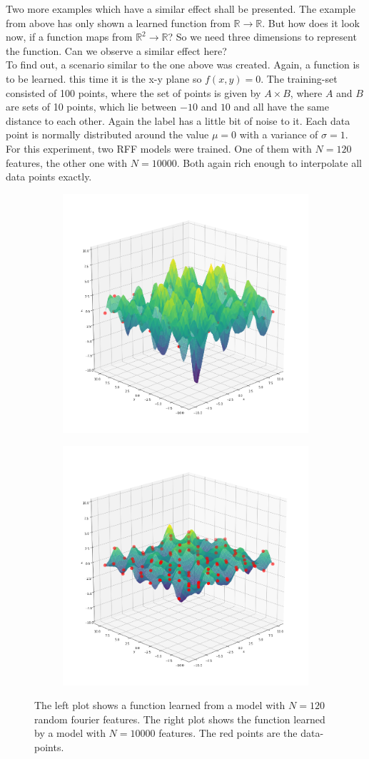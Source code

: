\newpage

Two more examples which have a similar effect shall be presented.
The example from above has only shown a learned function from 
$\mathbb{R} \rightarrow \mathbb{R}$. But how does it look now, if a function maps from $\mathbb{R}^2 \rightarrow \mathbb{R}$? So we need three dimensions to represent the function. Can we observe a similar effect here?\\
To find out, a scenario similar to the one above was created. Again, a function is to be learned. this time it is the x-y plane so $f(x,y) = 0$.
The training-set consisted of 100 points, where the set of points is given by $A\times B$, where $A$ and $B$ are sets of 10 points, which lie between $-10$ and $10$ and all have the same distance to each other. Again the label has a little bit of noise to it. Each data point is normally distributed around the value $\mu = 0$ with a variance of $\sigma = 1$.\\
For this experiment, two RFF models were trained. One of them with $N = 120$ features, the other one with $N =10000$. Both again rich enough to interpolate all data points exactly.

\begin{figure}[!htp]
\centering
\begin{subfigure}{}
  \centering
  \includegraphics[width=.49\linewidth]{Abschlussarbeit_2021/LaTeX/images/120_RFF_3d.png}
  \label{fig:sub1}
\end{subfigure}%
\begin{subfigure}{}
  \centering
  \includegraphics[width=.49\linewidth]{Abschlussarbeit_2021/LaTeX/images/10000_RFF_3d.png}
  \label{fig:sub2}
\label{fig:high_varianz_with_noise}  
\end{subfigure}
\caption{The left plot shows a function learned from a model with $N = 120$ random fourier features. The right plot shows the function learned by a model with $N = 10000$ features. The red points are the data-points.}
\label{3d_RFF}
\end{figure}


